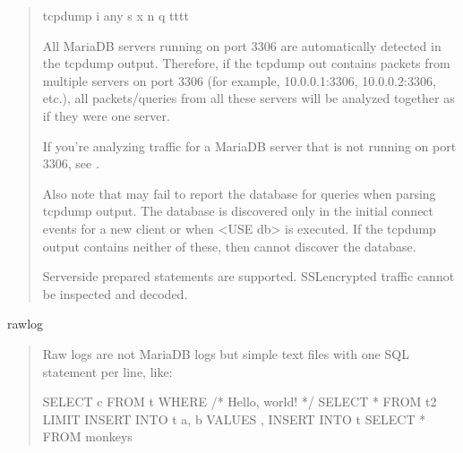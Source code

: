 \documentclass[letterpaper,10pt,english]{sphinxmanual}
\begin{document}
\begin{fulllineitems}
\begin{quote}
\begin{sphinxVerbatim}[commandchars=\\\{\}]
tcpdump \PYGZhy{}i any \PYGZhy{}s  \PYGZhy{}x \PYGZhy{}n \PYGZhy{}q \PYGZhy{}tttt 
\end{sphinxVerbatim}

\sphinxAtStartPar
All MariaDB servers running on port 3306 are automatically detected in the
tcpdump output.  Therefore, if the tcpdump out contains packets from
multiple servers on port 3306 (for example, 10.0.0.1:3306, 10.0.0.2:3306,
etc.), all packets/queries from all these servers will be analyzed
together as if they were one server.

\sphinxAtStartPar
If you’re analyzing traffic for a MariaDB server that is not running on port
3306, see {\hyperref[\detokenize{mariadb-query-digest:cmdoption-mariadb-query-digest-watch-server}]{}}.

\sphinxAtStartPar
Also note that  may fail to report the database for queries
when parsing tcpdump output.  The database is discovered only in the initial
connect events for a new client or when \textless{}USE db\textgreater{} is executed.  If the tcpdump
output contains neither of these, then  cannot discover the
database.

\sphinxAtStartPar
Server\sphinxhyphen{}side prepared statements are supported.  SSL\sphinxhyphen{}encrypted traffic cannot be
inspected and decoded.
\end{quote}

\sphinxAtStartPar
rawlog
\begin{quote}

\sphinxAtStartPar
Raw logs are not MariaDB logs but simple text files with one SQL statement
per line, like:

\begin{sphinxVerbatim}[commandchars=\\\{\}]
SELECT c FROM t WHERE 
/* Hello, world! */ SELECT * FROM t2 LIMIT 
INSERT INTO t a, b VALUES , 
INSERT INTO t SELECT * FROM monkeys
\end{sphinxVerbatim}


\end{quote}
\end{fulllineitems}
\end{document}
